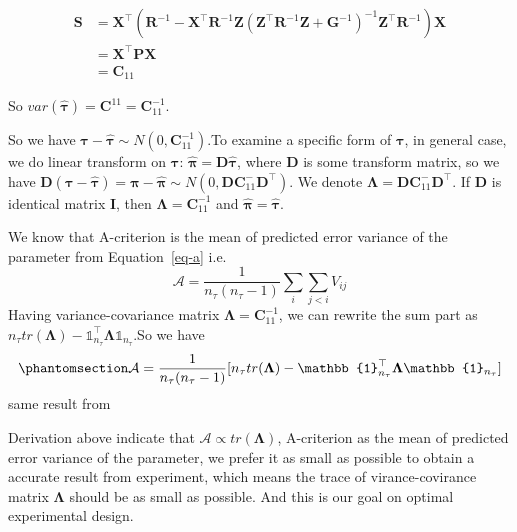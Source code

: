 \documentclass[
  a4paper,
  oneside,
  openany,
  12pt,
  onecolumn]{book}
\theoremstyle{definition}
\theoremstyle{plain}
\theoremstyle{remark}
\begin{document}
\[\begin{aligned}
\boldsymbol{S}
&=\boldsymbol{X}^\top(\boldsymbol{R}^{-1} - \boldsymbol{X}^\top \boldsymbol{R}^{-1} \boldsymbol{Z} (\boldsymbol{Z}^\top \boldsymbol{R}^{-1} \boldsymbol{Z} + \boldsymbol{G}^{-1})^{-1} \boldsymbol{Z}^\top \boldsymbol{R}^{-1})\boldsymbol{X}\\
&=\boldsymbol{X}^\top\boldsymbol{P}\boldsymbol{X}\\
&=\boldsymbol{C}_{11}
\end{aligned}\]

So
\(var(\hat{\boldsymbol{\tau}})=\boldsymbol{C}^{11}=\boldsymbol{C}_{11}^{-1}\).

So we have
\(\boldsymbol{\tau}-\hat{\boldsymbol{\tau}}\sim N(0,\boldsymbol{C}_{11}^{-1})\).To
examine a specific form of \(\boldsymbol{\tau}\), in general case, we do
linear transform on \(\boldsymbol{\tau}\):
\(\hat{\boldsymbol{\pi}}=\boldsymbol{D}\hat{\boldsymbol{\tau}}\), where
\(\boldsymbol{D}\) is some transform matrix, so we have
\(\boldsymbol{D}(\boldsymbol{\tau}-\hat{\boldsymbol{\tau}})=\boldsymbol{\pi}-\hat{\boldsymbol{\pi}}\sim N(0,\boldsymbol{D}\boldsymbol{C}_{11}^{-}\boldsymbol{D}^\top)\).
We denote
\(\boldsymbol{\Lambda}=\boldsymbol{D}\boldsymbol{C}_{11}^{-}\boldsymbol{D}^\top\).
If \(\boldsymbol{D}\) is identical matrix \(\boldsymbol{I}\), then
\(\boldsymbol{\Lambda}=\boldsymbol{C}_{11}^{-1}\) and
\(\hat{\boldsymbol{\pi}}=\hat{\boldsymbol{\tau}}\).

We know that A-criterion is the mean of predicted error variance of the
parameter from Equation~\ref{eq-a} i.e.~ \[
\mathcal{A}=\frac{1}{n_{\tau}(n_{\tau}-1)}\sum_{i}\sum_{j<i}V_{ij}
\] Having variance-covariance matrix
\(\boldsymbol{\Lambda}=\boldsymbol{C}_{11}^{-1}\), we can rewrite the
sum part as
\(n_{\tau}tr(\boldsymbol{\Lambda})-\mathbb{1}_{n_{\tau}}^\top\boldsymbol{\Lambda}\mathbb{1}_{n_{\tau}}\).So
we have \begin{equation}\phantomsection\label{eq-an}{
\mathcal{A}=\frac{1}{n_{\tau}(n_{\tau}-1)}[n_{\tau}tr(\boldsymbol{\Lambda})-\mathbb{1}_{n_{\tau}}^\top\boldsymbol{\Lambda}\mathbb{1}_{n_{\tau}}]
}\end{equation} same result from \citet{butler2013model}

Derivation above indicate that
\(\mathcal{A}\propto tr(\boldsymbol{\Lambda})\), A-criterion as the mean
of predicted error variance of the parameter, we prefer it as small as
possible to obtain a accurate result from experiment, which means the
trace of virance-covirance matrix \(\boldsymbol{\Lambda}\) should be as
small as possible. And this is our goal on optimal experimental design.
\end{document}
